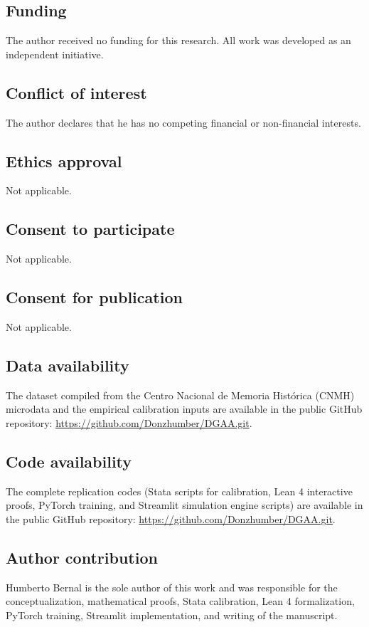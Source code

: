 \documentclass[pdflatex,sn-mathphys-ay]{sn-jnl}
\theoremstyle{plain}
\theoremstyle{definition}
\newcommand{\1}{\mathbf{1}}
\begin{document}
\subsection*{Funding}
The author received no funding for this research. All work was developed as an independent initiative.

\subsection*{Conflict of interest}
The author declares that he has no competing financial or non-financial interests.

\subsection*{Ethics approval}
Not applicable.

\subsection*{Consent to participate}
Not applicable.

\subsection*{Consent for publication}
Not applicable.

\subsection*{Data availability}
The dataset compiled from the Centro Nacional de Memoria Histórica (CNMH) microdata and the empirical calibration inputs are available in the public GitHub repository: \url{https://github.com/Donzhumber/DGAA.git}.

\subsection*{Code availability}
The complete replication codes (Stata scripts for calibration, Lean 4 interactive proofs, PyTorch training, and Streamlit simulation engine scripts) are available in the public GitHub repository: \url{https://github.com/Donzhumber/DGAA.git}.

\subsection*{Author contribution}
Humberto Bernal is the sole author of this work and was responsible for the conceptualization, mathematical proofs, Stata calibration, Lean 4 formalization, PyTorch training, Streamlit implementation, and writing of the manuscript.


\end{document}
